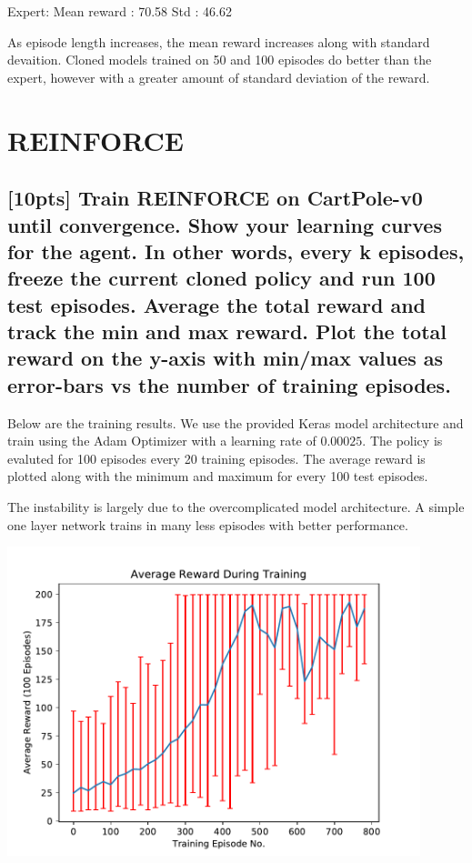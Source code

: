 \documentclass{article}
\begin{document}
Expert:
Mean reward : 70.58
Std : 46.62

As episode length increases, the mean reward increases along with standard devaition. 
Cloned models trained on 50 and 100 episodes do better than the expert, however with a greater amount of standard deviation of the reward. 




\section{REINFORCE}

\subsection{[10pts] Train REINFORCE on CartPole-v0 until convergence. Show your learning curves for the agent. In other words, every k episodes, freeze the current cloned policy and run 100 test episodes. Average the total reward and track the min and max reward. Plot the total reward on the y-axis with min/max values as error-bars vs the number of training episodes.}

Below are the training results. We use the provided Keras model architecture and train using the Adam Optimizer with a learning rate of $0.00025$. The policy is evaluted for 100 episodes every 20 training episodes. The average reward is plotted along with the minimum and maximum for every 100 test episodes.

The instability is largely due to the overcomplicated model architecture. A simple one layer network trains in many less episodes with better performance.
\begin{center}
  \includegraphics[width=12cm]{images/reinforce_plot.pdf}
\end{center}
\end{document}
